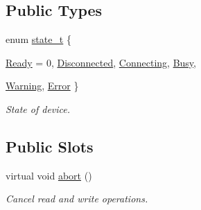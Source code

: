 \subsection*{Public Types}
\begin{DoxyCompactItemize}
\item 
enum \hyperlink{classmdt_port_manager_a9448339d7f08ca5e18b904df25b382da}{state\_\-t} \{ \par
\hyperlink{classmdt_port_manager_a9448339d7f08ca5e18b904df25b382daaf2ba40e19587c3a98235ee96a4acf20e}{Ready} =  0, 
\hyperlink{classmdt_port_manager_a9448339d7f08ca5e18b904df25b382daa4004253e25d51b1e628bb5006dbbd153}{Disconnected}, 
\hyperlink{classmdt_port_manager_a9448339d7f08ca5e18b904df25b382daa89e805c9c75c39ecc8371d5f38131227}{Connecting}, 
\hyperlink{classmdt_port_manager_a9448339d7f08ca5e18b904df25b382daa5da3fa5dd98a264ecb4a37a1983ea0ff}{Busy}, 
\par
\hyperlink{classmdt_port_manager_a9448339d7f08ca5e18b904df25b382daa8ca72085e29c5c6745294e58684e5d3c}{Warning}, 
\hyperlink{classmdt_port_manager_a9448339d7f08ca5e18b904df25b382daa687598301ad573e51cafaa209da72718}{Error}
 \}
\begin{DoxyCompactList}\small\item\em State of device. \end{DoxyCompactList}\end{DoxyCompactItemize}
\subsection*{Public Slots}
\begin{DoxyCompactItemize}
\item 
virtual void \hyperlink{classmdt_port_manager_a1d185e9bb610aee16ccd9499ae7bff0d}{abort} ()
\begin{DoxyCompactList}\small\item\em Cancel read and write operations. \end{DoxyCompactList}\end{DoxyCompactItemize}
